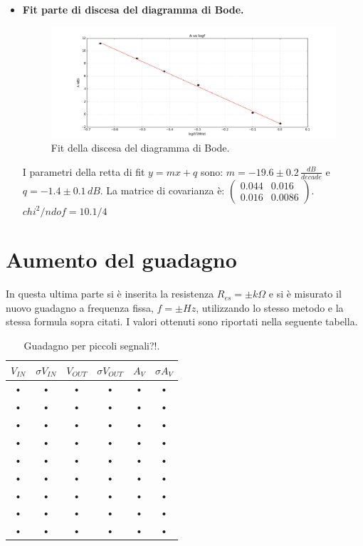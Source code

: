 \documentclass[10pt,a4paper]{article}
\begin{document}
\begin{itemize}
\item \textbf{Fit parte di discesa del diagramma di Bode.}

\begin{figure}[!htb]
  \centering
  \includegraphics[scale=1.0]{discesa.png}
\caption{Fit della discesa del diagramma di Bode.}
\label{discesa}
\end{figure}

I parametri della retta di fit $y = mx+q$ sono: $m = -19.6 \pm 0.2 \, \frac{dB}{decade}$ e $q = -1.4 \pm 0.1 \, dB$. La matrice di covarianza è:
$\left( \begin{array}{cc}
0.044 & 0.016 \\ 
0.016 & 0.0086
\end{array} \right)
$.\\
$chi^2/ndof = 10.1/4$

\end{itemize}


\section{Aumento del guadagno}
In questa ultima parte si è inserita la resistenza $R_{es}= \pm k\Omega$ e si è misurato il nuovo guadagno a frequenza fissa, $f= \pm Hz$, utilizzando lo stesso metodo e la stessa formula sopra citati. I valori ottenuti sono riportati nella seguente tabella.

\begin{table}[h]
\centering
\begin{tabular}{|c|c|c|c|c|c|}
\hline 
$V_{IN}$ & $\sigma V_{IN}$ & $V_{OUT}$ & $\sigma V_{OUT}$ & $A_V$ & $\sigma A_V$ \\ 
\hline 
• & • & • & • & • & • \\ 
\hline 
• & • & • & • & • & • \\ 
\hline 
• & • & • & • & • & • \\ 
\hline 
• & • & • & • & • & • \\ 
\hline 
• & • & • & • & • & • \\ 
\hline 
• & • & • & • & • & • \\ 
\hline 
• & • & • & • & • & • \\ 
\hline 
• & • & • & • & • & • \\ 
\hline 
• & • & • & • & • & • \\ 
\hline 
\end{tabular}
\caption{Guadagno per piccoli segnali?!.}
\end{table}
\end{document}
